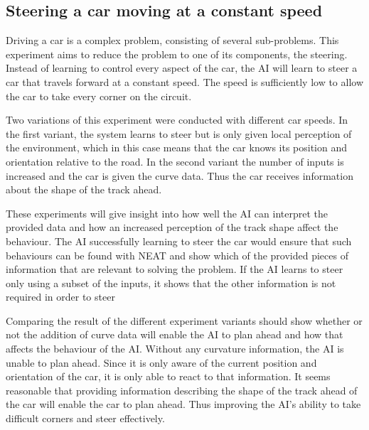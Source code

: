 \subsection{Steering a car moving at a constant speed}
\label{method:constant_speed}
Driving a car is a complex problem, consisting of several sub-problems. This experiment aims to reduce the problem to one of its components, the steering. Instead of learning to control every aspect of the car, the AI will learn to steer a car that travels forward at a constant speed. The speed is sufficiently low to allow the car to take every corner on the circuit. 


Two variations of this experiment were conducted with different car speeds. In the first variant, the system learns to steer but is only given local perception of the environment, which in this case means that the car knows its position and orientation relative to the road. In the second variant the number of inputs is increased and the car is given the curve data. Thus the car receives information about the shape of the track ahead.

These experiments will give insight into how well the AI can interpret the provided data and how an increased perception of the track shape affect the behaviour. The AI successfully learning to steer the car would ensure that such behaviours can be found with NEAT and show which of the provided pieces of information that are relevant to solving the problem. If the AI learns to steer only using a subset of the inputs, it shows that the other information is not required in order to steer

Comparing the result of the different experiment variants should show whether or not the addition of curve data will enable the AI to plan ahead and how that affects the behaviour of the AI. Without any curvature information, the AI is unable to plan ahead. Since it is only aware of the current position and orientation of the car, it is only able to react to that information. It seems reasonable that providing information describing the shape of the track ahead of the car will enable the car to plan ahead. Thus improving the AI's ability to take difficult corners and steer effectively. 


